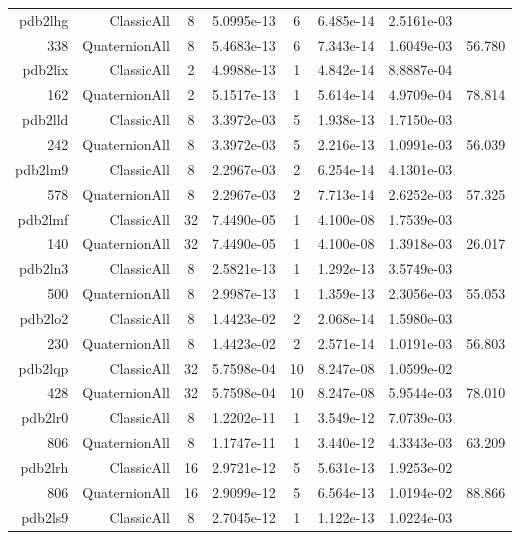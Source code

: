 \begin{xltabular}{\textwidth}{r|rcS[table-format=1.4e+2]cS[table-format=1.3e+2]S[table-format=1.4e+2]S[table-format=-1.3]}
pdb2lhg & ClassicAll & 8 & 5.0995e-13 & 6 & 6.485e-14 & 2.5161e-03 & \\
338 & QuaternionAll & 8 & 5.4683e-13 & 6 & 7.343e-14 & 1.6049e-03 & 56.780\\  \addlinespace
pdb2lix & ClassicAll & 2 & 4.9988e-13 & 1 & 4.842e-14 & 8.8887e-04 & \\
162 & QuaternionAll & 2 & 5.1517e-13 & 1 & 5.614e-14 & 4.9709e-04 & 78.814\\  \addlinespace
pdb2lld & ClassicAll & 8 & 3.3972e-03 & 5 & 1.938e-13 & 1.7150e-03 & \\
242 & QuaternionAll & 8 & 3.3972e-03 & 5 & 2.216e-13 & 1.0991e-03 & 56.039\\  \addlinespace
pdb2lm9 & ClassicAll & 8 & 2.2967e-03 & 2 & 6.254e-14 & 4.1301e-03 & \\
578 & QuaternionAll & 8 & 2.2967e-03 & 2 & 7.713e-14 & 2.6252e-03 & 57.325\\  \addlinespace
pdb2lmf & ClassicAll & 32 & 7.4490e-05 & 1 & 4.100e-08 & 1.7539e-03 & \\
140 & QuaternionAll & 32 & 7.4490e-05 & 1 & 4.100e-08 & 1.3918e-03 & 26.017\\  \addlinespace
pdb2ln3 & ClassicAll & 8 & 2.5821e-13 & 1 & 1.292e-13 & 3.5749e-03 & \\
500 & QuaternionAll & 8 & 2.9987e-13 & 1 & 1.359e-13 & 2.3056e-03 & 55.053\\  \addlinespace
pdb2lo2 & ClassicAll & 8 & 1.4423e-02 & 2 & 2.068e-14 & 1.5980e-03 & \\
230 & QuaternionAll & 8 & 1.4423e-02 & 2 & 2.571e-14 & 1.0191e-03 & 56.803\\  \addlinespace
pdb2lqp & ClassicAll & 32 & 5.7598e-04 & 10 & 8.247e-08 & 1.0599e-02 & \\
428 & QuaternionAll & 32 & 5.7598e-04 & 10 & 8.247e-08 & 5.9544e-03 & 78.010\\  \addlinespace
pdb2lr0 & ClassicAll & 8 & 1.2202e-11 & 1 & 3.549e-12 & 7.0739e-03 & \\
806 & QuaternionAll & 8 & 1.1747e-11 & 1 & 3.440e-12 & 4.3343e-03 & 63.209\\  \addlinespace
pdb2lrh & ClassicAll & 16 & 2.9721e-12 & 5 & 5.631e-13 & 1.9253e-02 & \\
806 & QuaternionAll & 16 & 2.9099e-12 & 5 & 6.564e-13 & 1.0194e-02 & 88.866\\  \addlinespace
pdb2ls9 & ClassicAll & 8 & 2.7045e-12 & 1 & 1.122e-13 & 1.0224e-03 & \\

\end{xltabular}
